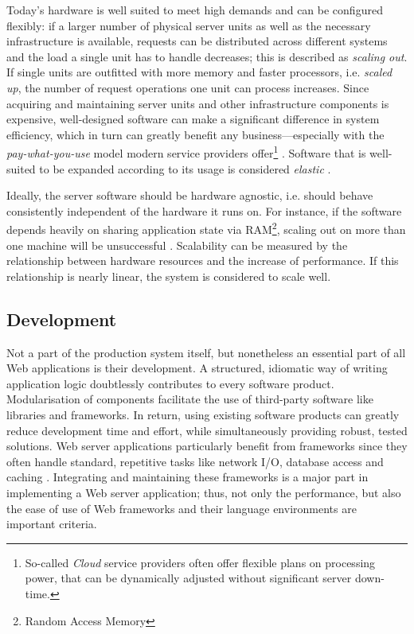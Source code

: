 Today's hardware is well suited to meet high demands and can be configured flexibly: if a larger number of physical server units as well as the necessary infrastructure is available, requests can be distributed across different systems and the load a single unit has to handle decreases; this is described as \textit{scaling out}. If single units are outfitted with more memory and faster processors, i.e. \textit{scaled up}, the number of request operations one unit can process increases. Since acquiring and maintaining server units and other infrastructure components is expensive, well-designed software can make a significant difference in system efficiency, which in turn can greatly benefit any business---especially with the \textit{pay-what-you-use} model modern service providers offer\footnote{So-called \textit{Cloud} service providers often offer flexible plans on processing power, that can be dynamically adjusted without significant server down-time.} \cite[p. 11]{Hughes-Croucher2012}. Software that is well-suited to be expanded according to its usage is considered \textit{elastic} \cite{reactive}.

Ideally, the server software should be hardware agnostic, i.e. should behave consistently independent of the hardware it runs on. For instance, if the software depends heavily on sharing application state via RAM\footnote{Random Access Memory}, scaling out on more than one machine will be unsuccessful \cite{Veal2007}. Scalability can be measured by the relationship between hardware resources and the increase of performance. If this relationship is nearly linear, the system is considered to scale well.

\subsection{Development}
Not a part of the production system itself, but nonetheless an essential part of all Web applications is their development. A structured, idiomatic way of writing application logic doubtlessly contributes to every software product. Modularisation of components facilitate the use of third-party software like libraries and frameworks. In return, using existing software products can greatly reduce development time and effort, while simultaneously providing robust, tested solutions. Web server applications particularly benefit from frameworks since they often handle standard, repetitive tasks like network I/O, database access and caching \cite[p. 1]{Reelsen2011}. Integrating and maintaining these frameworks is a major part in implementing a Web server application; thus, not only the performance, but also the ease of use of Web frameworks and their language environments are important criteria.


